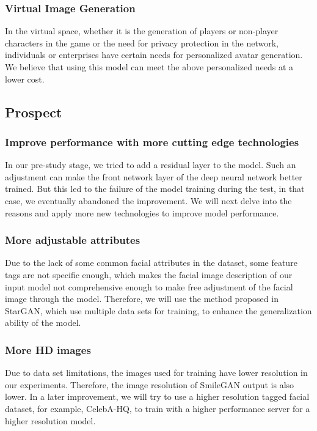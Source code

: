 \subsubsection*{Virtual Image Generation}
In the virtual space, whether it is the generation of players or non-player characters in the game or the need for privacy protection in the network, individuals or enterprises have certain needs for personalized avatar generation.
We believe that using this model can meet the above personalized needs at a lower cost.

\subsection{Prospect}
\subsubsection*{Improve performance with more cutting edge technologies}

In our pre-study stage, we tried to add a residual layer to the model.
Such an adjustment can make the front network layer of the deep neural network better trained.
But this led to the failure of the model training during the test, in that case, we eventually abandoned the improvement.
We will next delve into the reasons and apply more new technologies to improve model performance.


\subsubsection*{More adjustable attributes}

Due to the lack of some common facial attributes in the dataset, some feature tags are not specific enough, which makes the facial image description of our input model not comprehensive enough to make free adjustment of the facial image through the model.
Therefore, we will use the method proposed in StarGAN, which use multiple data sets for training, to enhance the generalization ability of the model.


\subsubsection*{More HD images}
Due to data set limitations, the images used for training have lower resolution in our experiments.
Therefore, the image resolution of SmileGAN output is also lower.
In a later improvement, we will try to use a higher resolution tagged facial dataset, for example, CelebA-HQ, to train with a higher performance server for a higher resolution model.
